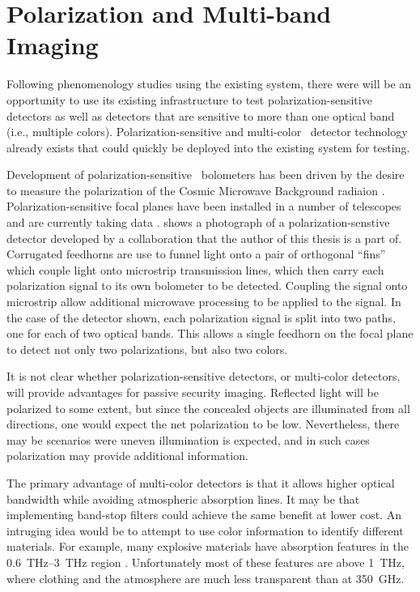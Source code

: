 \section{Polarization and Multi-band Imaging}

Following phenomenology studies using the existing system, there were will be an opportunity to use its existing infrastructure to test polarization-sensitive detectors as well as detectors that are sensitive to more than one optical band (i.e., multiple colors).
Polarization-sensitive and multi-color \TES\ detector technology already exists that could quickly be deployed into the existing system for testing.

Development of polarization-sensitive \TES\ bolometers has been driven by the desire to measure the polarization of the Cosmic Microwave Background radiaion \cite{decadel?}.
Polarization-sensitive focal planes have been installed in a number of telescopes and are currently taking data \cite{xxx}.
 shows a photograph of a polarization-senstive detector developed by a collaboration that the author of this thesis is a part of.
Corrugated feedhorns are use to funnel light onto a pair of orthogonal ``fins'' which couple light onto microstrip transmission lines, which then carry each polarization signal to its own bolometer to be detected.
Coupling the signal onto microstrip allow additional microwave processing to be applied to the signal.
In the case of the detector shown, each polarization signal is split into two paths, one for each of two optical bands.
This allows a single feedhorn on the focal plane to detect not only two polarizations, but also two colors.

It is not clear whether polarization-sensitive detectors, or multi-color detectors, will provide advantages for passive security imaging.
Reflected light will be polarized to some extent, but since the concealed objects are illuminated from all directions, one would expect the net polarization to be low.
Nevertheless, there may be scenarios were uneven illumination is expected, and in such cases polarization may provide additional information.

The primary advantage of multi-color detectors is that it allows higher optical bandwidth while avoiding atmospheric absorption lines.
It may be that implementing band-stop filters could achieve the same benefit at lower cost.
An intruging idea would be to attempt to use color information to identify different materials.
For example, many explosive materials have absorption features in the \SIrange{0.6}{3}{\THz} region \cite{xxx}.
Unfortunately most of these features are above \SI{1}{\THz}, where clothing and the atmosphere are much less transparent than at \SI{350}{\GHz}.

